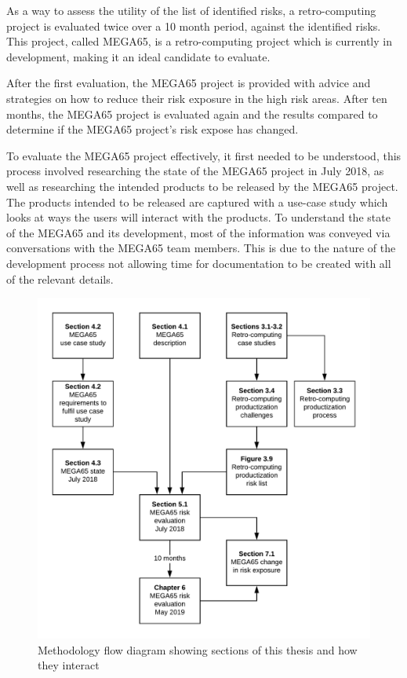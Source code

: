 As a way to assess the utility of the list of identified risks, a retro-computing project is evaluated twice over a 10 month period, against the identified risks. This project, called MEGA65, is a retro-computing project which is currently in development, making it an ideal candidate to evaluate. 

After the first evaluation, the MEGA65 project is provided with advice and strategies on how to reduce their risk exposure in the high risk areas. After ten months, the MEGA65 project is evaluated again and the results compared to determine if the MEGA65 project's risk expose has changed. 

To evaluate the MEGA65 project effectively, it first needed to be understood, this process involved researching the state of the MEGA65 project in July 2018, as well as researching the intended products to be released by the MEGA65 project. The products intended to be released are captured with a use-case study which looks at ways the users will interact with the products. To understand the state of the MEGA65 and its development, most of the information was conveyed via conversations with the MEGA65 team members. This is due to the nature of the development process not allowing time for documentation to be created with all of the relevant details. 

\begin{figure} \begin{center}
\includegraphics[width=1\linewidth]{pics/thesis_methodology} 
\end{center} 
\caption{Methodology flow diagram showing sections of this thesis and how they interact}
\label{methodology_diagram}
\end{figure}

